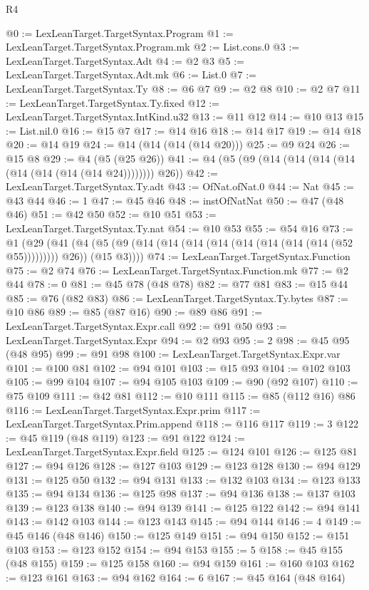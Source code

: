 \begin{lexlean}{R4}
\begin{coremodule}
@0 := LexLeanTarget.TargetSyntax.Program
@1 := LexLeanTarget.TargetSyntax.Program.mk
@2 := List.cons.{0}
@3 := LexLeanTarget.TargetSyntax.Adt
@4 := @2 @3
@5 := LexLeanTarget.TargetSyntax.Adt.mk
@6 := List.{0}
@7 := LexLeanTarget.TargetSyntax.Ty
@8 := @6 @7
@9 := @2 @8
@10 := @2 @7
@11 := LexLeanTarget.TargetSyntax.Ty.fixed
@12 := LexLeanTarget.TargetSyntax.IntKind.u32
@13 := @11 @12
@14 := @10 @13
@15 := List.nil.{0}
@16 := @15 @7
@17 := @14 @16
@18 := @14 @17
@19 := @14 @18
@20 := @14 @19
@24 := @14 (@14 (@14 (@14 @20)))
@25 := @9 @24
@26 := @15 @8
@29 := @4 (@5 (@25 @26))
@41 := @4 (@5 (@9 (@14 (@14 (@14 (@14 (@14 (@14 (@14 (@14 @24)))))))) @26))
@42 := LexLeanTarget.TargetSyntax.Ty.adt
@43 := OfNat.ofNat.{0}
@44 := Nat
@45 := @43 @44
@46 := 1
@47 := @45 @46
@48 := instOfNatNat
@50 := @47 (@48 @46)
@51 := @42 @50
@52 := @10 @51
@53 := LexLeanTarget.TargetSyntax.Ty.nat
@54 := @10 @53
@55 := @54 @16
@73 := @1
    (@29
      (@41 (@4 (@5 (@9 (@14 (@14 (@14 (@14 (@14 (@14 (@14 (@14 (@52 @55))))))))) @26)) (@15 @3))))
@74 := LexLeanTarget.TargetSyntax.Function
@75 := @2 @74
@76 := LexLeanTarget.TargetSyntax.Function.mk
@77 := @2 @44
@78 := 0
@81 := @45 @78 (@48 @78)
@82 := @77 @81
@83 := @15 @44
@85 := @76 (@82 @83)
@86 := LexLeanTarget.TargetSyntax.Ty.bytes
@87 := @10 @86
@89 := @85 (@87 @16)
@90 := @89 @86
@91 := LexLeanTarget.TargetSyntax.Expr.call
@92 := @91 @50
@93 := LexLeanTarget.TargetSyntax.Expr
@94 := @2 @93
@95 := 2
@98 := @45 @95 (@48 @95)
@99 := @91 @98
@100 := LexLeanTarget.TargetSyntax.Expr.var
@101 := @100 @81
@102 := @94 @101
@103 := @15 @93
@104 := @102 @103
@105 := @99 @104
@107 := @94 @105 @103
@109 := @90 (@92 @107)
@110 := @75 @109
@111 := @42 @81
@112 := @10 @111
@115 := @85 (@112 @16) @86
@116 := LexLeanTarget.TargetSyntax.Expr.prim
@117 := LexLeanTarget.TargetSyntax.Prim.append
@118 := @116 @117
@119 := 3
@122 := @45 @119 (@48 @119)
@123 := @91 @122
@124 := LexLeanTarget.TargetSyntax.Expr.field
@125 := @124 @101
@126 := @125 @81
@127 := @94 @126
@128 := @127 @103
@129 := @123 @128
@130 := @94 @129
@131 := @125 @50
@132 := @94 @131
@133 := @132 @103
@134 := @123 @133
@135 := @94 @134
@136 := @125 @98
@137 := @94 @136
@138 := @137 @103
@139 := @123 @138
@140 := @94 @139
@141 := @125 @122
@142 := @94 @141
@143 := @142 @103
@144 := @123 @143
@145 := @94 @144
@146 := 4
@149 := @45 @146 (@48 @146)
@150 := @125 @149
@151 := @94 @150
@152 := @151 @103
@153 := @123 @152
@154 := @94 @153
@155 := 5
@158 := @45 @155 (@48 @155)
@159 := @125 @158
@160 := @94 @159
@161 := @160 @103
@162 := @123 @161
@163 := @94 @162
@164 := 6
@167 := @45 @164 (@48 @164)

\end{coremodule}
\end{lexlean}

